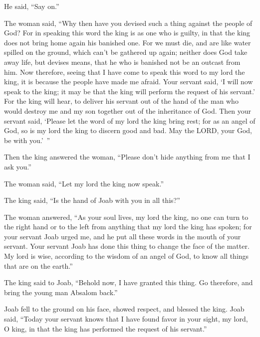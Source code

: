 He said, “Say on.”

\myverse{}The woman said, “Why then have you devised such a thing against
the people of God? For in speaking this word the king is as one who is guilty, in that the king does not
bring home again his banished one.
\myverse{}For we must die, and are like water spilled on the ground, which can’t be
gathered up again; neither does God take away life, but devises means, that he who is banished not be
an outcast from him.
\myverse{}Now therefore, seeing that I have come to speak this word to my lord the
king, it is because the people have made me afraid. Your servant said, ‘I will now speak to the king;
it may be that the king will perform the request of his servant.’
\myverse{}For the king will hear, to deliver his servant out of the hand of the man
who would destroy me and my son together out of the inheritance of God.
\myverse{}Then your servant said, ‘Please let the word of my lord the king bring rest;
for as an angel of God, so is my lord the king to discern good and bad. May the LORD, your God, be with
you.’ ”

\myverse{}Then the king answered the woman, “Please don’t hide anything
from me that I ask you.”

The woman said, “Let my lord the king now speak.”

\myverse{}The king said, “Is the hand of Joab with you in all this?”

The woman answered, “As your soul lives, my lord the king, no one can turn to the right hand
or to the left from anything that my lord the king has spoken; for your servant Joab urged me, and he
put all these words in the mouth of your servant.
\myverse{}Your servant Joab has done this thing to change the face of the matter. My
lord is wise, according to the wisdom of an angel of God, to know all things that are on the earth.”

\myverse{}The king said to Joab, “Behold now, I have granted this thing.
Go therefore, and bring the young man Absalom back.”

\myverse{}Joab fell to the ground on his face, showed respect, and blessed
the king. Joab said, “Today your servant knows that I have found favor in your sight, my lord, O king,
in that the king has performed the request of his servant.”


